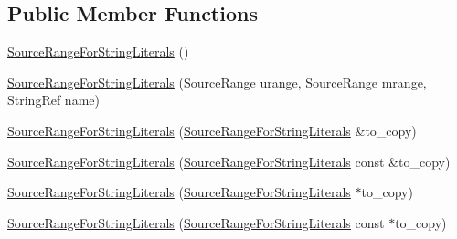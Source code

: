 \subsection*{Public Member Functions}
\begin{DoxyCompactItemize}
\item 
\hyperlink{classclang_1_1tidy_1_1pagesjaunes_1_1_exec_s_q_l_prepare_fmtd_to_function_call_1_1_source_range_for_string_literals_aec017f348974b51122f7f249824f713a}{Source\+Range\+For\+String\+Literals} ()
\item 
\hyperlink{classclang_1_1tidy_1_1pagesjaunes_1_1_exec_s_q_l_prepare_fmtd_to_function_call_1_1_source_range_for_string_literals_a49fc3e241c0add51fdc8388dd37d9811}{Source\+Range\+For\+String\+Literals} (Source\+Range urange, Source\+Range mrange, String\+Ref name)
\item 
\hyperlink{classclang_1_1tidy_1_1pagesjaunes_1_1_exec_s_q_l_prepare_fmtd_to_function_call_1_1_source_range_for_string_literals_a974d4c05f64567e5ff4ac1bcb7f51b2c}{Source\+Range\+For\+String\+Literals} (\hyperlink{classclang_1_1tidy_1_1pagesjaunes_1_1_exec_s_q_l_prepare_fmtd_to_function_call_1_1_source_range_for_string_literals}{Source\+Range\+For\+String\+Literals} \&to\+\_\+copy)
\item 
\hyperlink{classclang_1_1tidy_1_1pagesjaunes_1_1_exec_s_q_l_prepare_fmtd_to_function_call_1_1_source_range_for_string_literals_a774bdf8bf1ca2b8da8deb9b36f704979}{Source\+Range\+For\+String\+Literals} (\hyperlink{classclang_1_1tidy_1_1pagesjaunes_1_1_exec_s_q_l_prepare_fmtd_to_function_call_1_1_source_range_for_string_literals}{Source\+Range\+For\+String\+Literals} const \&to\+\_\+copy)
\item 
\hyperlink{classclang_1_1tidy_1_1pagesjaunes_1_1_exec_s_q_l_prepare_fmtd_to_function_call_1_1_source_range_for_string_literals_a965bf9f92e8d641012291e62f947ed02}{Source\+Range\+For\+String\+Literals} (\hyperlink{classclang_1_1tidy_1_1pagesjaunes_1_1_exec_s_q_l_prepare_fmtd_to_function_call_1_1_source_range_for_string_literals}{Source\+Range\+For\+String\+Literals} $\ast$to\+\_\+copy)
\item 
\hyperlink{classclang_1_1tidy_1_1pagesjaunes_1_1_exec_s_q_l_prepare_fmtd_to_function_call_1_1_source_range_for_string_literals_aa49769a187634e1770e9a9f5f6770b6b}{Source\+Range\+For\+String\+Literals} (\hyperlink{classclang_1_1tidy_1_1pagesjaunes_1_1_exec_s_q_l_prepare_fmtd_to_function_call_1_1_source_range_for_string_literals}{Source\+Range\+For\+String\+Literals} const $\ast$to\+\_\+copy)
\item 

\end{DoxyCompactItemize}
